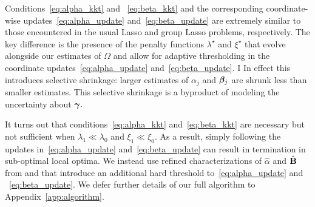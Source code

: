 Conditions~\eqref{eq:alpha_kkt} and ~\eqref{eq:beta_kkt} and the corresponding coordinate-wise updates~\eqref{eq:alpha_update} and~\eqref{eq:beta_update} are extremely similar to those encountered in the usual Lasso and group Lasso problems, respectively.
The key difference is the presence of the penalty functions $\lambda^{\star}$ and $\xi^{\star}$ that evolve alongside our estimates of $\Omega$ and allow for adaptive thresholding in the coordinate updates~\eqref{eq:alpha_update} and~\eqref{eq:beta_update}.
I%
In effect this introduces selective shrinkage: larger estimates of $\alpha_{j}$ and $\boldsymbol{\beta}_{j}$ are shrunk less than smaller estimates. 
This selective shrinkage is a byproduct of modeling the uncertainty about $\boldsymbol{\gamma}.$

It turns out that conditions~\eqref{eq:alpha_kkt} and~\eqref{eq:beta_kkt} are necessary but not sufficient when $\lambda_{1} \ll \lambda_{0}$ and $\xi_{1} \ll \xi_{0}.$
As a result, simply following the updates in~\eqref{eq:alpha_update} and~\eqref{eq:beta_update} can result in termination in sub-optimal local optima. 
We instead use refined characterizations of $\hat{\alpha}$ and $\hat{\mathbf{B}}$ from \citet{RockovaGeorge2018} and \citet{Bai2020} that introduce an additional hard threshold to~\eqref{eq:alpha_update} and ~\eqref{eq:beta_update}.
We defer further details of our full algorithm to Appendix~\ref{app:algorithm}. 



